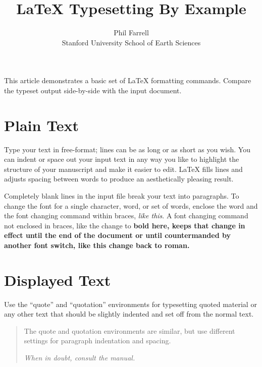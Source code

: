 \setlength{\topmargin}{-.5in}
\setlength{\textheight}{9in}
\setlength{\oddsidemargin}{.125in}
\setlength{\textwidth}{6.25in}

\title{LaTeX Typesetting By Example}
\author{Phil Farrell\\
Stanford University School of Earth Sciences}
\renewcommand{\today}{November 2, 1994}
\maketitle
This article demonstrates a basic set of LaTeX formatting commands.
Compare the typeset output side-by-side with the input document.

\section {Plain Text}
Type your text in free-format; lines can be as long
or as short
as you wish.
      You can indent      or space out
        your input
          text in
            any way you like to highlight the structure
      of your manuscript and make it easier to edit.
LaTeX fills lines and adjusts spacing between words to produce an
aesthetically pleasing result.

Completely blank lines in the input file break your text into
paragraphs.
To change the font for a single character, word, or set of words,
enclose the word and the font changing command within braces,
{\em like this}.
A font changing command not enclosed in braces, like the change to \bf
bold here, keeps that change in effect until the end of the document or
until countermanded by another font switch, like this change back to
\rm roman. 

\section {Displayed Text}
Use the ``quote'' and ``quotation'' environments for typesetting quoted
material or any other text that should be slightly indented and set off
from the normal text.
\begin{quotation}
The quote and quotation environments are similar, but use different
settings for paragraph indentation and spacing.

\em When in doubt, consult the manual.
\end{quotation}

